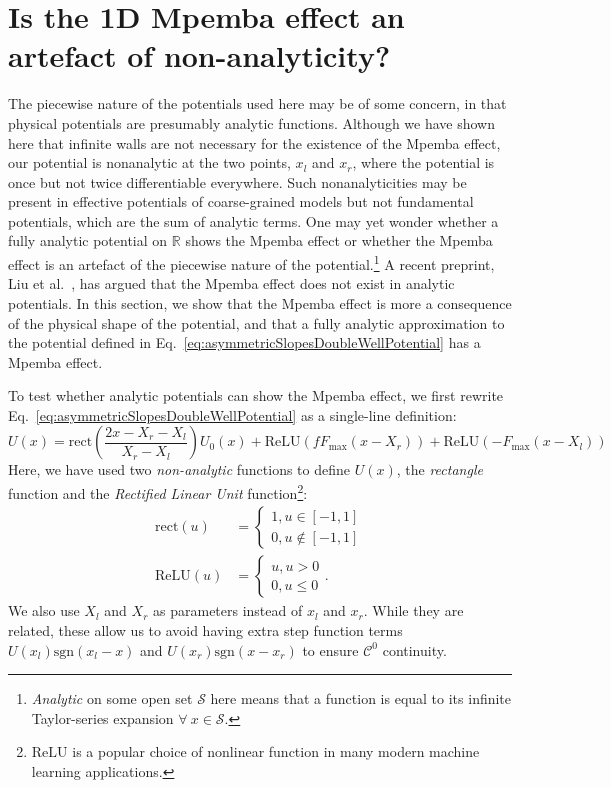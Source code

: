 \documentclass[hyperref={colorlinks=true, urlcolor=blue, citecolor=blue, final, bound}]{sfuthesis}
\newcommand{\sgn}{\mathrm{sgn}}
\begin{document}
\section{Is the 1D Mpemba effect an artefact of non-analyticity?}
The piecewise nature of the potentials used here may be of some concern, in that physical potentials are presumably analytic functions. Although we have shown here that infinite walls are not necessary for the existence of the Mpemba effect, our potential is nonanalytic at the two points, $x_l$ and $x_r$, where the potential is once but not twice differentiable everywhere. Such nonanalyticities may be present in effective potentials of coarse-grained models but not fundamental potentials, which are the sum of analytic terms. One may yet wonder whether a fully analytic potential on $\mathbb R$ shows the Mpemba effect or whether the Mpemba effect is an artefact of the piecewise nature of the potential.\footnote{\textit{Analytic} on some open set $\mathcal S$ here means that a function is equal to its infinite Taylor-series expansion $\forall\ x\in\mathcal S$.} A recent preprint, Liu et al.~\cite{Liu2026}, has argued that the Mpemba effect does not exist in analytic potentials. In this section, we show that the Mpemba effect is more a consequence of the physical shape of the potential, and that a fully analytic approximation to the potential defined in Eq.~\ref{eq:asymmetricSlopesDoubleWellPotential} has a Mpemba effect.

To test whether analytic potentials can show the Mpemba effect, we first rewrite Eq.~\ref{eq:asymmetricSlopesDoubleWellPotential} as a single-line definition:
\begin{equation}
    U(x) = \mathrm{rect}\left( \frac{2x-X_r-X_l}{X_r-X_l} \right)U_0(x)+\mathrm{ReLU}(fF_{\max}(x-X_r))+\mathrm{ReLU}(-F_{\max}(x-X_l))
\end{equation}
Here, we have used two \textit{non-analytic} functions to define $U(x)$, the \textit{rectangle} function and the \textit{Rectified Linear Unit} function\footnote{$\mathrm{ReLU}$ is a popular choice of nonlinear function in many modern machine learning applications.}:
\begin{align}
    \mathrm{rect}(u) &= \begin{cases}
        1, u\in [-1,1]\\
        0, u\notin [-1,1]
    \end{cases}\\
    \mathrm{ReLU}(u) &= \begin{cases}
        u, u > 0\\
        0, u \leq 0
    \end{cases}.
\end{align}
We also use $X_l$ and $X_r$ as parameters instead of $x_l$ and $x_r$. While they are related, these allow us to avoid having extra step function terms $U(x_l)\sgn(x_l-x)$ and $U(x_r)\sgn(x-x_r)$ to ensure $\mathcal C^0$ continuity.
\end{document}
